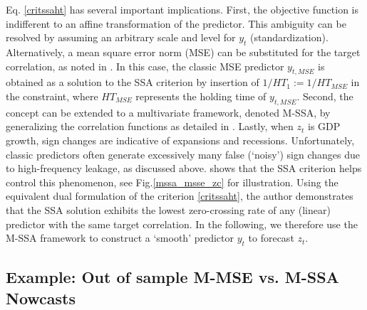 \documentclass[11pt,a4paper]{article}
\begin{document}
Eq. \eqref{critssaht} has several important implications. First, the objective function is indifferent to an affine transformation of the predictor. This ambiguity can be resolved by assuming an arbitrary scale and level for $y_t$ (standardization). Alternatively, a mean square error norm (MSE) can be substituted for the target correlation, as noted in \cite{Wildi2025}. In this case, the classic MSE predictor $y_{t,MSE}$ is obtained as a solution to the SSA criterion by insertion of $1/HT_1:=1/HT_{MSE}$ in the constraint, where $HT_{MSE}$ represents the holding time of $y_{t,MSE}$. %
Second, the concept can be extended to a multivariate framework, denoted M-SSA, by generalizing the correlation functions as detailed in \cite{Wildi2025}. 
Lastly, when $z_t$ is GDP growth, sign changes are indicative of expansions and recessions.
Unfortunately, classic predictors often generate excessively many false (`noisy') sign changes due to high-frequency leakage, as discussed above.
 \cite{Wildi2025} shows that the SSA criterion helps control this phenomenon,  see Fig.\ref{mssa_msse_zc} for illustration. Using the equivalent dual formulation of the criterion \eqref{critssaht}, the author demonstrates that the SSA solution exhibits the lowest zero-crossing rate of any (linear) predictor with the same target correlation. In the following, we therefore use the M-SSA framework to construct a `smooth' predictor $y_t$ to forecast $z_t$. %


\subsection{Example: Out of sample M-MSE vs. M-SSA Nowcasts}
\end{document}
